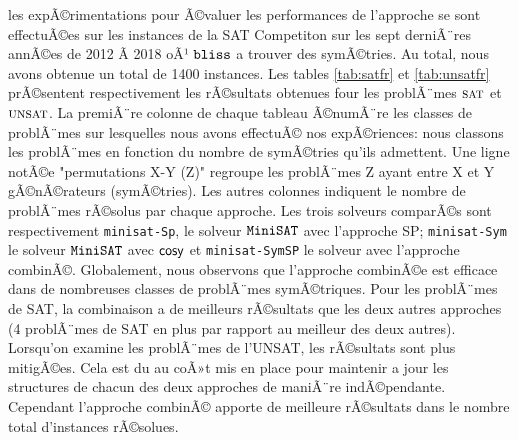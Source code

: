\begin{table}[!htbp]\footnotesize
 \centering
 \caption{Comparaison des approches sur les instances UNSAT.}
 \label{tab:unsatfr}
\end{table}
les expÃ©rimentations pour Ã©valuer les performances de l'approche se sont effectuÃ©es sur les instances de la SAT Competiton sur les sept derniÃ¨res annÃ©es de 2012 Ã  2018 oÃ¹ $\texttt{bliss}$ a trouver des symÃ©tries. Au total, nous avons obtenue un total de 1400 instances. 
Les tables \ref{tab:satfr} et \ref{tab:unsatfr} prÃ©sentent respectivement
les rÃ©sultats obtenues four les problÃ¨mes $\textsc{sat}$ et $\textsc{unsat}$.
La premiÃ¨re colonne de chaque tableau Ã©numÃ¨re les classes de problÃ¨mes sur lesquelles nous avons effectuÃ© nos expÃ©riences: nous classons les problÃ¨mes en fonction du nombre de symÃ©tries qu'ils admettent. Une ligne notÃ©e "permutations X-Y (Z)" regroupe les problÃ¨mes Z ayant entre X et Y gÃ©nÃ©rateurs (symÃ©tries). Les autres colonnes indiquent le nombre de problÃ¨mes rÃ©solus par chaque approche. Les trois solveurs comparÃ©s sont respectivement
\texttt{minisat-Sp}, le solveur $\texttt{MiniSAT}$ avec l'approche SP; \texttt{minisat-Sym} le solveur $\texttt{MiniSAT}$ avec $\textsf{cosy}$ et \texttt{minisat-SymSP} le solveur avec l'approche combinÃ©.
Globalement, nous observons que l'approche combinÃ©e est efficace dans de nombreuses classes de problÃ¨mes symÃ©triques. Pour les problÃ¨mes de SAT, la combinaison a de meilleurs rÃ©sultats que les deux autres approches (4 problÃ¨mes de SAT en plus par rapport au meilleur des deux autres). Lorsqu'on examine les problÃ¨mes de l'UNSAT, les rÃ©sultats sont plus mitigÃ©es. Cela est du au coÃ»t mis en place pour maintenir a jour les structures
de chacun des deux approches de maniÃ¨re indÃ©pendante.
Cependant l'approche combinÃ© apporte de meilleure rÃ©sultats dans le nombre total d'instances rÃ©solues.
